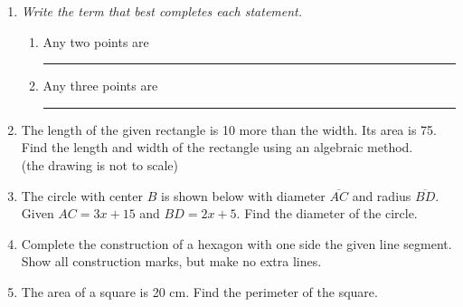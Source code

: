 \documentclass[12pt, twoside]{article}
\begin{document}
\begin{enumerate}
\item \emph{Write the term that best completes each statement.}
  \begin{enumerate}
  \item Any two points are \rule{4cm}{0.15mm} \bigskip
  \item Any three points are  \rule{4cm}{0.15mm}
  \end{enumerate}
  
  \newpage

\item The length of the given rectangle is 10 more than the width. Its area is 75. Find the length and width of the rectangle using an algebraic method.\\[5pt]
  (the drawing is not to scale)
  \begin{flushright}
  \end{flushright} \vspace{5cm}

\item The circle with center $B$ is shown below with diameter $\overline{AC}$ and radius $\overline{BD}$. Given $AC=3x+15$ and $BD=2x+5$. Find the diameter of the circle.
  \begin{flushright}
  \end{flushright} \vspace{2cm}

\newpage

\item Complete the construction of a hexagon with one side the given line segment. Show all construction marks, but make no extra lines. \vspace{9cm}
  \begin{center}
  \end{center} \vspace{4cm}

\item The area of a square is 20 cm. Find the perimeter of the square.

\end{enumerate}
\end{document}
